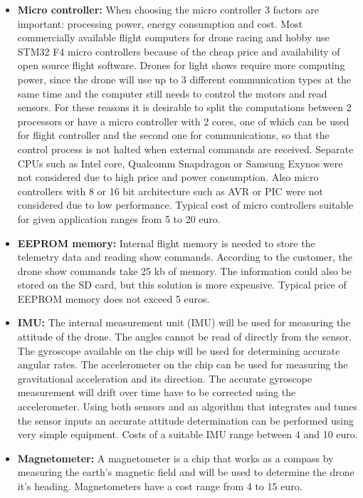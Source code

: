 \begin{itemize}[noitemsep,nolistsep]
    \item \textbf{Micro controller:} When choosing the micro controller 3 factors are important: processing power, energy consumption and cost. Most commercially available flight computers for drone racing and hobby use STM32 F4 micro controllers because of the cheap price and availability of open source flight software. Drones for light shows require more computing power, since the drone will use up to 3 different communication types at the same time and the computer still needs to control the motors and read sensors. For these reasons it is desirable to split the computations between 2 processors or have a micro controller with 2 cores, one of which can be used for flight controller and the second one for communications, so that the control process is not halted when external commands are received. Separate CPUs such as Intel core, Qualcomm Snapdragon or Samsung Exynos were not considered due to high price and power consumption. Also micro controllers with 8 or 16 bit architecture such as AVR or PIC were not considered due to low performance. Typical cost of micro controllers suitable for given application ranges from 5 to 20 euro. 
    \item \textbf{EEPROM memory:} Internal flight memory is needed to store the telemetry data and reading show commands. According to the customer, the drone show commands take 25 kb of memory. The information could also be stored on the SD card, but this solution is more expensive. Typical price of  EEPROM memory does not exceed 5 euros.  
    \item \textbf{IMU:} The internal measurement unit (IMU) will be used for measuring the attitude of the drone. The angles cannot be read of directly from the sensor. The gyroscope available on the chip will be used for determining accurate angular rates. The accelerometer on the chip can be used for measuring the gravitational acceleration and its direction. The accurate gyroscope measurement will drift over time have to be corrected using the accelerometer. Using both sensors and an algorithm that integrates and tunes the sensor inputs an accurate attitude determination can be performed using very simple equipment. Costs of a suitable IMU range between 4 and 10 euro.
    \item \textbf{Magnetometer:} A magnetometer is a chip that works as a compass by measuring the earth's magnetic field and will be used to determine the drone it's heading. Magnetometers have a cost range from 4 to 15 euro.

\end{itemize}
